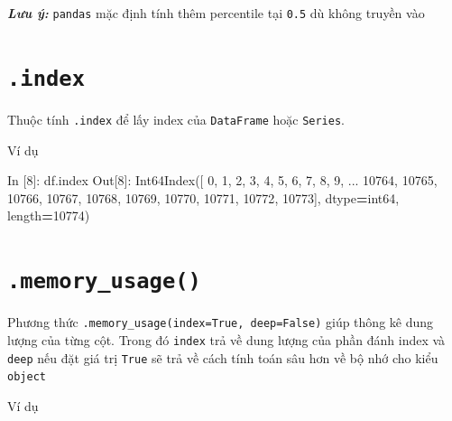 \documentclass[
]{book}
\makeatletter
\newenvironment{Shaded}{\begin{snugshade}}{\end{snugshade}}
\newcommand{\DecValTok}[1]{\textcolor[rgb]{0.00,0.00,0.81}{#1}}
\newcommand{\NormalTok}[1]{#1}
\newcommand{\OperatorTok}[1]{\textcolor[rgb]{0.81,0.36,0.00}{\textbf{#1}}}
\newcommand{\StringTok}[1]{\textcolor[rgb]{0.31,0.60,0.02}{#1}}
\newenvironment{kframe}{%
\medskip{}
\setlength{\fboxsep}{.8em}
 \def\at@end@of@kframe{}%
 \ifinner\ifhmode%
  \def\at@end@of@kframe{\end{minipage}}%
  \begin{minipage}{\columnwidth}%
 \fi\fi%
 \def\FrameCommand##1{\hskip\@totalleftmargin \hskip-\fboxsep
 \colorbox{shadecolor}{##1}\hskip-\fboxsep
     \hskip-\linewidth \hskip-\@totalleftmargin \hskip\columnwidth}%
 \MakeFramed {\advance\hsize-\width
   \@totalleftmargin\z@ \linewidth\hsize
   \@setminipage}}%
 {\par\unskip\endMakeFramed%
 \at@end@of@kframe}
\newenvironment{rmdblock}[1]
  {
  \begin{itemize}
  \renewcommand{\labelitemi}{
    \raisebox{-.7\height}[0pt][0pt]{
      {\setkeys{Gin}{width=3em,keepaspectratio}\texttt{[image: images/\#1]}}
    }
  }
  \setlength{\fboxsep}{1em}
  \begin{kframe}
  \item
  }
  {
  \end{kframe}
  \end{itemize}
  }
\newenvironment{rmdnote}
  {\begin{rmdblock}{note}}
  {\end{rmdblock}}
\makeatother
\begin{document}
\begin{rmdnote}
\textbf{\emph{Lưu ý:}}
\texttt{pandas} mặc định tính thêm percentile tại \texttt{0.5} dù không truyền vào
\end{rmdnote}

\section{\texorpdfstring{\texttt{.index}}{.index}}\label{index}

Thuộc tính \texttt{.index} để lấy index của \texttt{DataFrame} hoặc \texttt{Series}.

Ví dụ

\begin{Shaded}
\begin{Highlighting}[]
\NormalTok{In [}\DecValTok{8}\NormalTok{]: df.index}
\NormalTok{Out[}\DecValTok{8}\NormalTok{]: }
\NormalTok{Int64Index([    }\DecValTok{0}\NormalTok{,     }\DecValTok{1}\NormalTok{,     }\DecValTok{2}\NormalTok{,     }\DecValTok{3}\NormalTok{,     }\DecValTok{4}\NormalTok{,     }\DecValTok{5}\NormalTok{,     }\DecValTok{6}\NormalTok{,     }\DecValTok{7}\NormalTok{,     }\DecValTok{8}\NormalTok{,}
                \DecValTok{9}\NormalTok{,}
\NormalTok{            ...}
            \DecValTok{10764}\NormalTok{, }\DecValTok{10765}\NormalTok{, }\DecValTok{10766}\NormalTok{, }\DecValTok{10767}\NormalTok{, }\DecValTok{10768}\NormalTok{, }\DecValTok{10769}\NormalTok{, }\DecValTok{10770}\NormalTok{, }\DecValTok{10771}\NormalTok{, }\DecValTok{10772}\NormalTok{,}
            \DecValTok{10773}\NormalTok{],}
\NormalTok{           dtype}\OperatorTok{=}\StringTok{\textquotesingle{}int64\textquotesingle{}}\NormalTok{, length}\OperatorTok{=}\DecValTok{10774}\NormalTok{)}
\end{Highlighting}
\end{Shaded}

\section{\texorpdfstring{\texttt{.memory\_usage()}}{.memory\_usage()}}\label{memory_usage}

Phương thức \texttt{.memory\_usage(index=True,\ deep=False)} giúp thông kê dung lượng của từng cột. Trong đó \texttt{index} trả về dung lượng của phần đánh index và \texttt{deep} nếu đặt giá trị \texttt{True} sẽ trả về cách tính toán sâu hơn về bộ nhớ cho kiểu \texttt{object}

Ví dụ
\end{document}

